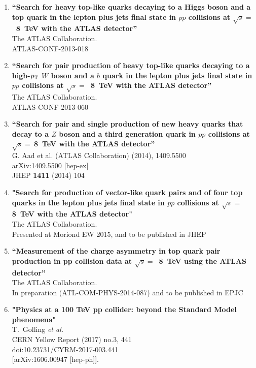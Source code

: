 \documentclass[12pt]{article}
\begin{document}
\begin{enumerate}
\item
{\bf ``Search for heavy top-like quarks decaying to a Higgs boson and a top quark in the lepton plus jets final state in $pp$ collisions at $\sqrt{s}=$~8~TeV with the ATLAS detector''}
  \\{}The ATLAS Collaboration.
  \\{}ATLAS-CONF-2013-018
  
\item
{\bf ``Search for pair production of heavy top-like quarks decaying to a high-$p_{\rm T}$ $W$ boson and a $b$ quark in the lepton plus jets final state in $pp$ collisions at $\sqrt{s}=$~8~TeV with the ATLAS detector''}
  \\{}The ATLAS Collaboration.
 \\{}ATLAS-CONF-2013-060

\item
{\bf ``Search for pair and single production of new heavy quarks that decay to a $Z$ boson and a third generation quark in $pp$ collisions at $\sqrt{s}=~$8~TeV with the ATLAS detector''}
  \\{}G. Aad et al. (ATLAS Collaboration) (2014), 1409.5500
   \\{}arXiv:1409.5500 [hep-ex]
   \\{}JHEP {\bf 1411} (2014) 104
   

 \item
{\bf "Search for production of vector-like quark pairs and of four top quarks in the lepton plus jets final state in $pp$ collisions at $\sqrt{s}=~$8~TeV with the ATLAS detector"}
\\{}The ATLAS Collaboration.
\\{}Presented at Moriond EW 2015, and to be published in JHEP

\item
{\bf ``Measurement of the charge asymmetry in top quark pair production in pp collision data at $\sqrt{s}=$~8~TeV using the ATLAS detector''}
  \\{}The ATLAS Collaboration.
  \\{}In preparation (ATL-COM-PHYS-2014-087) and to be published in EPJC

\item
{\bf "Physics at a 100 TeV pp collider: beyond the Standard Model phenomena"}
  \\{}T.~Golling {\it et al.}
  \\{}CERN Yellow Report (2017) no.3,  441
  \\{}doi:10.23731/CYRM-2017-003.441
  \\{}[arXiv:1606.00947 [hep-ph]].
 
\end{enumerate}
\end{document}
